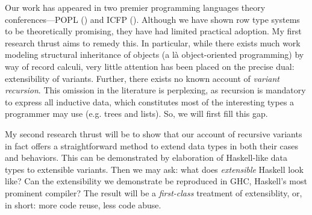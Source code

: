 \documentclass[open=any]{article}
\begin{document}
Our work has appeared in two premier programming languages theory conferences---POPL (\citet{MorrisM19}) and ICFP (\citet{HubersM23}). Although we have shown row type systems to be theoretically promising, they have had limited practical adoption. My first research thrust aims to remedy this. In particular, while there exists much work modeling structural inheritance of objects (a l\`{a} object-oriented programming) by way of record calculi, very little attention has been placed on the precise dual: extensibility of variants. Further, there exists no known account of \emph{variant recursion}. This omission in the literature is perplexing, as recursion is mandatory to express all inductive data, which constitutes most of the interesting types a programmer may use (e.g. trees and lists). So, we will first fill this gap. 

My second research thrust will be to show that our account of recursive variants in fact offers a straightforward method to extend data types in both their cases and behaviors. This can be demonstrated by elaboration of Haskell-like data types to extensible variants. Then we may ask: what does \emph{extensible} Haskell look like? Can the extensibility we demonstrate be reproduced in GHC, Haskell's most prominent compiler? The result will be a \emph{first-class} treatment of extensiblity, or, in short: more code reuse, less code abuse.



\end{document}
